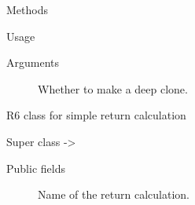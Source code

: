 \documentclass[a4paper]{book}
\begin{document}
\begin{Section}{Methods}
\begin{SubSection}{}
\begin{SubSubSection}{Usage}
\end{SubSubSection}

%
\begin{SubSubSection}{Arguments}

\begin{description}

\item[] Whether to make a deep clone.

\end{description}



\end{SubSubSection}

\end{SubSection}


\end{Section}
%
\begin{Description}
R6 class for simple return calculation
\end{Description}
%
\begin{Section}{Super class}
 -> 
\end{Section}
%
\begin{Section}{Public fields}

\begin{description}

\item[] Name of the return calculation.

\end{description}


\end{Section}
%
\end{document}
